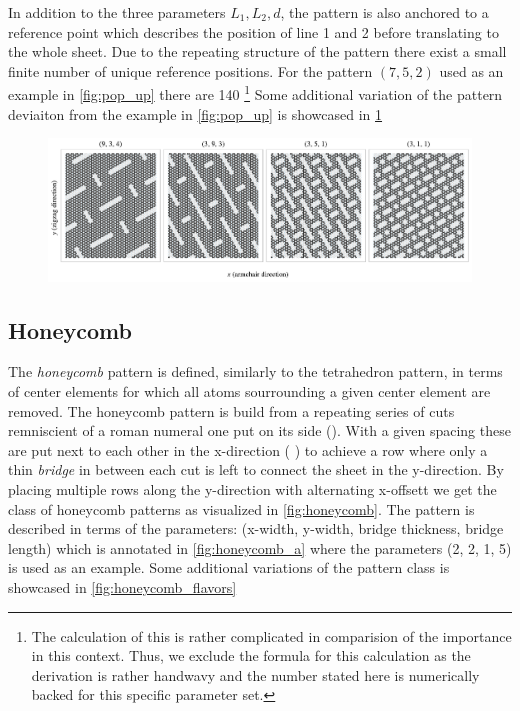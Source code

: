 In addition to the three parameters $L_1, L_2, d$, the pattern is also anchored to a reference point which describes the position of line 1 and 2 before translating to the whole sheet. Due to the repeating structure of the pattern there exist a small finite number of unique reference positions. For the pattern $(7, 5, 2)$ used as an example in \cref{fig:pop_up} there are 140 \footnote{The calculation of this is rather complicated in comparision of the importance in this context. Thus, we exclude the formula for this calculation as the derivation is rather handwavy and the number stated here is numerically backed for this specific parameter set.} Some additional variation of the pattern deviaiton from the example in \cref{fig:pop_up} is showcased in \cref{fig:pop_up_flavors}

\begin{figure}[H]
  \centering
  \includegraphics[width=\linewidth]{figures/system/pop_up_flavors.pdf}
  \caption{}
  \label{fig:pop_up_flavors}
\end{figure}



\subsection{Honeycomb}
The \textit{honeycomb} pattern is defined, similarly to the tetrahedron pattern,
in terms of center elements for which all atoms sourrounding a given center
element are removed. The honeycomb pattern is build from a repeating series of
cuts remniscient of a roman numeral one put on its side
(). With a given spacing these are put next to each other in the x-direction (
) to achieve a row
where only a thin \textit{bridge} in between each cut is left to connect the sheet in the y-direction. By placing multiple rows along the y-direction with alternating x-offsett we get the class of honeycomb patterns as visualized in \cref{fig:honeycomb}. The pattern
is described in terms of the parameters: (x-width, y-width, bridge thickness,
bridge length) which is annotated in \cref{fig:honeycomb_a} where the parameters (2, 2, 1, 5) is used as an example. Some additional variations of the pattern class is showcased in \cref{fig:honeycomb_flavors}


